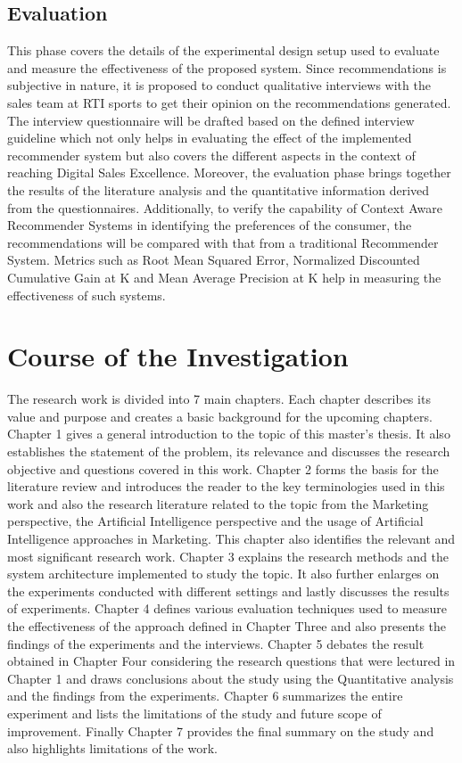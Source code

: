 \subsection{Evaluation}
This phase covers the details of the experimental design setup used to evaluate and measure the effectiveness of the proposed system. Since recommendations is subjective in nature, it is proposed to conduct qualitative interviews with the sales team at RTI sports to get their opinion on the recommendations generated. The interview questionnaire will be drafted based on the defined interview guideline which not only helps in evaluating the effect of the implemented recommender system but also covers the different aspects in the context of reaching Digital Sales Excellence. Moreover, the evaluation phase brings together the results of the literature analysis and the quantitative information derived from the questionnaires.
Additionally, to verify the capability of Context Aware Recommender Systems in identifying the preferences of the consumer, the recommendations will be compared with that from a traditional Recommender System. Metrics such as Root Mean Squared Error, Normalized Discounted Cumulative Gain at K and Mean Average Precision at K help in measuring the effectiveness of such systems.



\section{Course of the Investigation}
The research work is divided into 7 main chapters. Each chapter describes its value and purpose and creates a basic background for the upcoming chapters. Chapter 1 gives a general introduction to the topic of this master’s thesis. It also establishes the statement of the problem, its relevance and discusses the research objective and questions covered in this work. Chapter 2 forms the basis for the literature review and introduces the reader to the key terminologies used in this work and also the research literature related to the topic from the Marketing perspective, the Artificial Intelligence perspective and the usage of Artificial Intelligence approaches in Marketing. This chapter also identifies the relevant and most significant research work. Chapter 3 explains the research methods and the system architecture implemented to study the topic. It also further enlarges on the experiments conducted with different settings and lastly discusses the results of experiments.
Chapter 4 defines various evaluation techniques used to measure the effectiveness of the approach defined in Chapter Three and also presents the findings of the experiments and the interviews. Chapter 5 debates the result obtained in Chapter Four considering the research questions that were lectured in Chapter 1 and draws conclusions about the study using the Quantitative analysis and the findings from the experiments. Chapter 6 summarizes the entire experiment and lists the limitations of the study and future scope of improvement. Finally Chapter 7 provides the final summary on the study and also highlights limitations of the work. 
